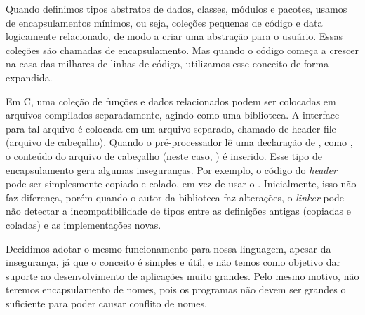 Quando definimos tipos abstratos de dados, classes, módulos
e pacotes, usamos de encapsulamentos  mínimos, ou seja, coleções pequenas
de código e data logicamente relacionado, de modo a criar uma abstração
para o usuário. Essas coleções são chamadas de encapsulamento.
Mas quando o código começa a crescer na casa das milhares de linhas de
código, utilizamos esse conceito de forma expandida.

Em C, uma coleção de funções e dados relacionados podem ser colocadas em
arquivos compilados separadamente, agindo como uma biblioteca. A interface para
tal arquivo é colocada em um arquivo separado, chamado de header file (arquivo
de cabeçalho). Quando o pré-processador lê uma declaração de
, como , o conteúdo do
arquivo de cabeçalho (neste caso, ) é inserido. Esse
tipo de encapsulamento gera algumas inseguranças. Por exemplo, o código do
\emph{header} pode ser simplesmente copiado e colado, em vez de usar o
. Inicialmente, isso não faz diferença, porém quando o
autor da biblioteca faz alterações, o \emph{linker} pode não detectar a
incompatibilidade de tipos entre as definições antigas (copiadas e coladas) e
as implementações novas.

Decidimos adotar o mesmo funcionamento para nossa linguagem, apesar da
insegurança, já que o conceito é simples e útil, e não temos como objetivo dar
suporte ao desenvolvimento de aplicações muito grandes. Pelo mesmo motivo, não
teremos encapsulamento de nomes, pois os programas não devem ser grandes o
suficiente para poder causar conflito de nomes.
